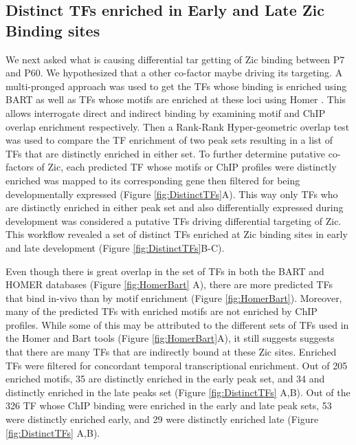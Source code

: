 \documentclass[fleqn,10pt,twocolumn]{wlscirep}
\begin{document}
\subsection*{Distinct TFs enriched in Early and Late Zic Binding sites}
We next asked what is causing differential tar getting of Zic binding between P7 and P60. We hypothesized that a other co-factor maybe driving its targeting. A multi-pronged approach was used to get the TFs whose binding is enriched using BART \cite{Zhenjiawang2018BART:Profiles, Ma2021BARTweb:Analysis} as well as TFs whose motifs are enriched at these loci using Homer \cite{}. This allows interrogate direct and indirect binding by examining motif and ChIP overlap enrichment respectively. Then a Rank-Rank Hyper-geometric overlap test was used to compare the TF enrichment of two peak sets resulting in a list of TFs that are distinctly enriched in either set. To further determine putative co-factors of Zic, each predicted TF whose motifs or ChIP profiles were distinctly enriched was mapped to its corresponding gene then filtered for being developmentally expressed  (Figure \ref{fig:DistinctTFs}A). This way only TFs who are distinctly enriched in either peak set and also differentially expressed during development was considered a putative TFs driving differential targeting of Zic. This workflow revealed a set of distinct TFs enriched at Zic binding sites in early and late development (Figure \ref{fig:DistinctTFs}B-C).

Even though there is great overlap in the set of TFs in both the BART and HOMER databases (Figure \ref{fig:HomerBart} A), there are more predicted TFs that bind in-vivo than by motif enrichment (Figure \ref{fig:HomerBart}). Moreover, many of the predicted TFs with enriched motifs are not enriched by ChIP profiles. While some of this may be attributed to the different sets of TFs used in the Homer and Bart tools (Figure \ref{fig:HomerBart}A), it still suggests suggests that there are many TFs that are indirectly bound at these Zic sites. Enriched TFs were filtered for concordant temporal transcriptional enrichment. Out of 205 enriched motifs, 35 are distinctly enriched in the early peak set, and 34 and distinctly enriched in the late peaks set (Figure \ref{fig:DistinctTFs} A,B). Out of the 326 TF whose ChIP binding were enriched in the early and late peak sets, 53 were distinctly enriched early, and 29 were distinctly enriched late (Figure \ref{fig:DistinctTFs} A,B).  
\end{document}
